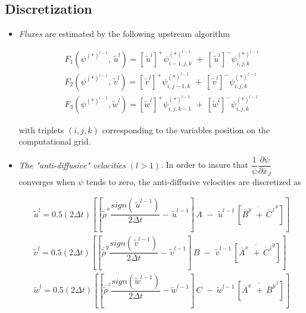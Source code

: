 \subsection{Discretization}

\begin{itemize}

\item {\em Fluxes } are estimated by the following upstream algorithm

\begin{eqnarray}
\label{flux1}
F_1(\psi^{(*)^{l-1}}, \,\tilde{u}^{l}) = [\,\tilde{u}^{l}]^{+}
\psi^{(*)^{l-1}}_{i-1,j,k}\,
\, + \ [\,\tilde{u}^{l}]^{-}
\psi^{(*)^{l-1}}_{i,j,k}\\
\label{flux2}
F_2(\psi^{(*)^{l-1}}, \,\tilde{v}^{l}) = [\,\tilde{v}^{l}]^{+}
\psi^{(*)^{l-1}}_{i,j-1,k}\,
\, + \ [\,\tilde{v}^{l}]^{-}
\psi^{(*)^{l-1}}_{i,j,k}\\
\label{flux3}
F_3(\psi^{(*)^{l-1}}, \tilde{w}^{l}) = [\tilde{w}^{l}]^{+}
\psi^{(*)^{l-1}}_{i,j,k-1}\,
\, + \ [\tilde{w}^{l}]^{-}
\psi^{(*)^{l-1}}_{i,j,k}
\end{eqnarray}

\noindent with triplets $(i,j,k)$ corresponding to the variables position
on the computational grid.

\item {\em The "anti-diffusive" velocities $(l>1)$}. In order to insure
that $\dfrac{1}{\psi} \dfrac{\partial \psi}{\partial \overline{x}_J}$
converges when $\psi$ tends to zero, the anti-diffusive velocities are
discretized as

\begin{eqnarray}
\tilde{u}^{l}  =  0.5(2\Delta t) \left[{
\left[ \overline{\tilde{\rho}}^{x} \dfrac{sign(\,\tilde{u}^{l-1})}{2\Delta t}
                                      - \,\tilde{u}^{l-1}  \right] \, A \,
\, - \, {\,\tilde{u}^{l-1}}\,
\left[\overline{ \overline{B}^y \,\,+ \, \overline{C}^z }^{x} \right]}\right] \\
\tilde{v}^{l}  =  0.5(2\Delta t) \left[{
\left[ \overline{\tilde{\rho}}^{y} \dfrac{sign(\,\tilde{v}^{l-1})}{2\Delta t}
                                      - \,\tilde{v}^{l-1}  \right] \, B \,
\, - \, {\,\tilde{v}^{l-1}}\,
\left[\overline{ \overline{A}^x \,\,+ \, \overline{C}^z }^{y} \right]}\right] \\
\tilde{w}^{l}  =  0.5(2\Delta t) \left[{
\left[ \overline{\tilde{\rho}}^{z} \dfrac{sign(  \tilde{w}^{l-1})}{2\Delta t}
                                      -   \tilde{w}^{l-1}  \right] \, C \,
\, - \, {  \tilde{w}^{l-1}}\,
\left[\overline{ \overline{A}^x \,\,+ \, \overline{B}^y }^{z} \right]}\right]
\end{eqnarray}



\end{itemize}
